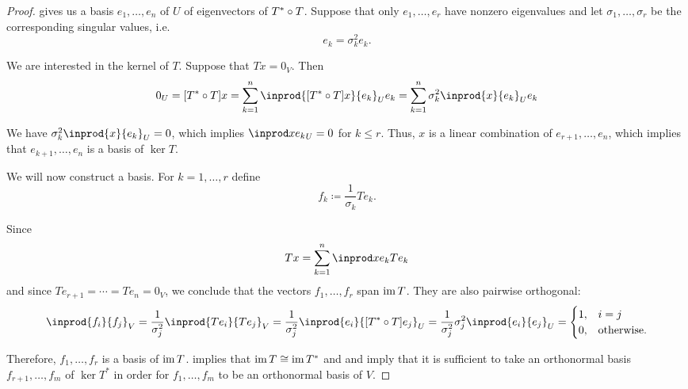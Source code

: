 \begin{proof}
    gives us a basis \( e_1, \ldots, e_n \) of \( U \) of eigenvectors of \( T^* \bincirc T \). Suppose that only \( e_1, \ldots, e_r \) have nonzero eigenvalues and let \( \sigma_1, \ldots, \sigma_r \) be the corresponding singular values, i.e.
  \begin{equation*}
    [T^* \bincirc T] e_k = \sigma_k^2 e_k.
  \end{equation*}

  We are interested in the kernel of \( T \). Suppose that \( Tx = 0_V \). Then
  \begin{equation*}
    0_U
    =
    [T^* \bincirc T] x
    =
    \sum_{k=1}^n \inprod { [T^* \bincirc T]x } { e_k }_U e_k
    =
    \sum_{k=1}^n \sigma_k^2 \inprod { x } { e_k }_U e_k
  \end{equation*}

  We have \( \sigma_k^2 \inprod { x } { e_k }_U = 0 \), which implies \( \inprod x { e_k }_U = 0 \) for \( k \leq r \). Thus, \( x \) is a linear combination of \( e_{r+1}, \ldots, e_n \), which implies that \( e_{k+1}, \ldots, e_n \) is a basis of \( \ker T \).

  We will now construct a basis. For \( k = 1, \ldots, r \) define
  \begin{equation*}
    f_k \coloneqq \frac 1 {\sigma_k} T e_k.
  \end{equation*}

  Since
  \begin{equation*}
    T x = \sum_{k=1}^n \inprod x { e_k } T e_k
  \end{equation*}
  and since \( T e_{r+1} = \cdots = T e_n = 0_V \), we conclude that the vectors \( f_1, \ldots, f_r \) span \( \operatorname{im} T \). They are also pairwise orthogonal:
  \begin{equation*}
    \inprod { f_i } { f_j }_V
    =
    \frac 1 {\sigma_j^2} \inprod { T e_i } { T e_j }_V
    =
    \frac 1 {\sigma_j^2} \inprod { e_i } { [T^* \bincirc T] e_j }_U
    =
    \frac 1 {\sigma_j^2} {\sigma_j^2} \inprod { e_i } { e_j }_U
    =
    \begin{cases}
      1, &i = j \\
      0, &\T{otherwise.}
    \end{cases}
  \end{equation*}

  Therefore, \( f_1, \ldots, f_r \) is a basis of \( \operatorname{im} T \).  implies that \( \operatorname{im} T \cong \operatorname{im} T^* \) and  and  imply that it is sufficient to take an orthonormal basis \( f_{r+1}, \ldots, f_m \) of \( \ker T^* \) in order for \( f_1, \ldots, f_m \) to be an orthonormal basis of \( V \).


\end{proof}
